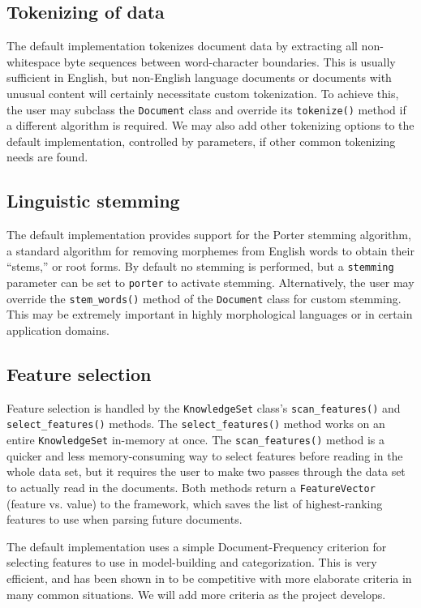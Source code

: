 \documentclass[a4paper,twocolumn]{article}
\begin{document}
\subsection*{Tokenizing of data}
The default implementation tokenizes document data by extracting 
all non-whitespace byte sequences between word-character 
boundaries.  This is usually sufficient in English,
but non-English language documents or documents with unusual content
will certainly necessitate custom tokenization.  To achieve this, the
user may subclass the \texttt{Document} class and override its
\texttt{tokenize()} method if a different algorithm is required.  We
may also add other tokenizing options to the default implementation,
controlled by parameters, if other common tokenizing needs are found.

\subsection*{Linguistic stemming}
The default implementation provides support for the Porter stemming
algorithm, a standard algorithm for removing morphemes from English
words to obtain their ``stems,'' or root forms.  By default no
stemming is performed, but a \texttt{stemming} parameter can be set to
\texttt{porter} to activate stemming.  Alternatively, the user may
override the \texttt{stem\_words()} method of the \texttt{Document}
class for custom stemming.  This may be extremely important in highly
morphological languages or in certain application domains.

\subsection*{Feature selection}
Feature selection is handled by the \texttt{KnowledgeSet} class's
\texttt{scan\_features()} and \texttt{select\_features()} methods.
The \texttt{select\_features()} method works on an entire
\texttt{KnowledgeSet} in-memory at once.  The
\texttt{scan\_features()} method is a quicker and less
memory-consuming way to select features before reading in the whole
data set, but it requires the user to make two passes through the data
set to actually read in the documents.  Both methods return a
\texttt{FeatureVector} (feature vs. value) to the framework, which
saves the list of highest-ranking features to use when parsing future
documents.

The default implementation uses a simple Document-Frequency criterion
for selecting features to use in model-building and categorization.
This is very efficient, and has been shown in \cite{yang:97} to be
competitive with more elaborate criteria in many common situations.
We will add more criteria as the project develops.
\end{document}
